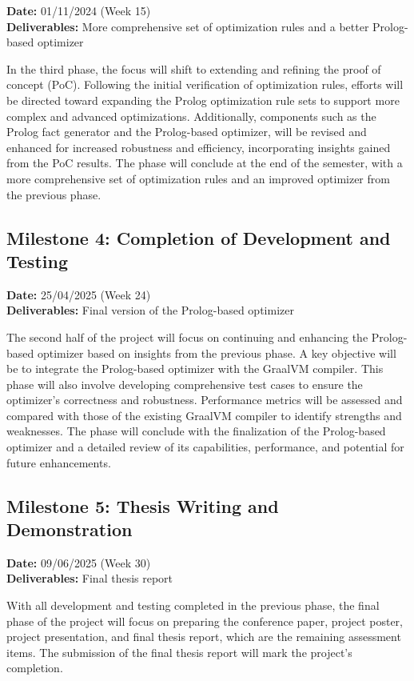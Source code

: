 \textbf{Date:} 01/11/2024 (Week 15) \\
\textbf{Deliverables:} More comprehensive set of optimization rules and a better Prolog-based optimizer

In the third phase, the focus will shift to extending and refining the proof of concept (PoC). Following the initial verification of optimization rules, efforts will be directed toward expanding the Prolog optimization rule sets to support more complex and advanced optimizations. Additionally, components such as the Prolog fact generator and the Prolog-based optimizer, will be revised and enhanced for increased robustness and efficiency, incorporating insights gained from the PoC results. The phase will conclude at the end of the semester, with a more comprehensive set of optimization rules and an improved optimizer from the previous phase.

\subsection{Milestone 4: Completion of Development and Testing}

\textbf{Date:} 25/04/2025 (Week 24) \\
\textbf{Deliverables:} Final version of the Prolog-based optimizer

The second half of the project will focus on continuing and enhancing the Prolog-based optimizer based on insights from the previous phase. A key objective will be to integrate the Prolog-based optimizer with the GraalVM compiler. This phase will also involve developing comprehensive test cases to ensure the optimizer’s correctness and robustness. Performance metrics will be assessed and compared with those of the existing GraalVM compiler to identify strengths and weaknesses. The phase will conclude with the finalization of the Prolog-based optimizer and a detailed review of its capabilities, performance, and potential for future enhancements.

\subsection{Milestone 5: Thesis Writing and Demonstration}
\textbf{Date:} 09/06/2025 (Week 30) \\
\textbf{Deliverables:} Final thesis report

With all development and testing completed in the previous phase, the final phase of the project will focus on preparing the conference paper, project poster, project presentation, and final thesis report, which are the remaining assessment items. The submission of the final thesis report will mark the project's completion.

